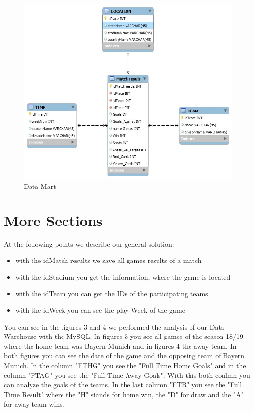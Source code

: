 \documentclass[11pt, journal]{IEEEtran}
\begin{document}
\begin{figure}[htb]
	\centering
		\includegraphics[width=1.0\columnwidth]{images/datamart}
	\caption{Data Mart}
	\label{fig:probov}
\end{figure}
\section{More Sections} \label{sec:further}
At the following points we describe our general solution:
\begin{itemize}
  \item with the idMatch results we save all  games results of a match
  \item with the idStadium you get the information, where the game is located
  \item with the idTeam you can get the IDs of the participating teams
  \item with the idWeek you can see the play Week of the game
\end{itemize}	
You can see in the figures 3 and 4 we performed the analysis of our Data Warehouse with the MySQL.
In figures 3 you see all games of the season 18/19 where the home team was Bayern Munich and in figures 4 the away team. In both figures you can see the date of the game and the opposing team of Bayern Munich. In the column "FTHG" you see the "Full Time Home Goals" and in the column "FTAG" you see the "Full Time Away Goals". With this both coulmn you can analyze the goals of the teams. In the last column "FTR" you see the "Full Time Result" where the "H" stands for home win, the "D" for draw and the "A" for away team wins.
\end{document}
